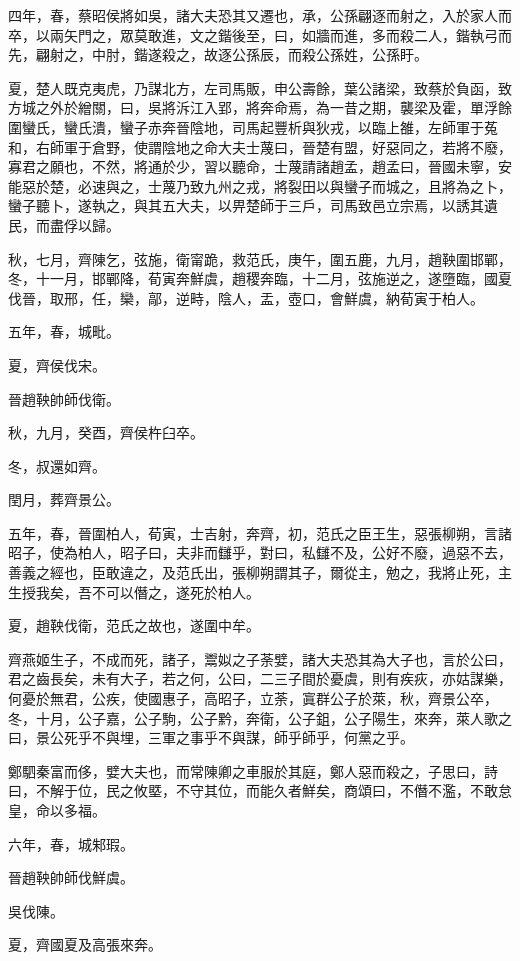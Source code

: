 \begin{pinyinscope}
四年，春，蔡昭侯將如吳，諸大夫恐其又遷也，承，公孫翩逐而射之，入於家人而卒，以兩矢門之，眾莫敢進，文之鍇後至，曰，如牆而進，多而殺二人，鍇執弓而先，翩射之，中肘，鍇遂殺之，故逐公孫辰，而殺公孫姓，公孫盱。

夏，楚人既克夷虎，乃謀北方，左司馬販，申公壽餘，葉公諸梁，致蔡於負函，致方城之外於繒關，曰，吳將泝江入郢，將奔命焉，為一昔之期，襲梁及霍，單浮餘圍蠻氏，蠻氏潰，蠻子赤奔晉陰地，司馬起豐析與狄戎，以臨上雒，左師軍于菟和，右師軍于倉野，使謂陰地之命大夫士蔑曰，晉楚有盟，好惡同之，若將不廢，寡君之願也，不然，將通於少，習以聽命，士蔑請諸趙孟，趙孟曰，晉國未寧，安能惡於楚，必速與之，士蔑乃致九州之戎，將裂田以與蠻子而城之，且將為之卜，蠻子聽卜，遂執之，與其五大夫，以畀楚師于三戶，司馬致邑立宗焉，以誘其遺民，而盡俘以歸。

秋，七月，齊陳乞，弦施，衛甯跪，救范氏，庚午，圍五鹿，九月，趙鞅圍邯鄲，冬，十一月，邯鄲降，荀寅奔鮮虞，趙稷奔臨，十二月，弦施逆之，遂墮臨，國夏伐晉，取邢，任，欒，鄗，逆畤，陰人，盂，壺口，會鮮虞，納荀寅于柏人。

五年，春，城毗。

夏，齊侯伐宋。

晉趙鞅帥師伐衛。

秋，九月，癸酉，齊侯杵臼卒。

冬，叔還如齊。

閏月，葬齊景公。

五年，春，晉圍柏人，荀寅，士吉射，奔齊，初，范氏之臣王生，惡張柳朔，言諸昭子，使為柏人，昭子曰，夫非而讎乎，對曰，私讎不及，公好不廢，過惡不去，善義之經也，臣敢違之，及范氏出，張柳朔謂其子，爾從主，勉之，我將止死，主生授我矣，吾不可以僭之，遂死於柏人。

夏，趙鞅伐衛，范氏之故也，遂圍中牟。

齊燕姬生子，不成而死，諸子，鬻姒之子荼嬖，諸大夫恐其為大子也，言於公曰，君之齒長矣，未有大子，若之何，公曰，二三子間於憂虞，則有疾疢，亦姑謀樂，何憂於無君，公疾，使國惠子，高昭子，立荼，寘群公子於萊，秋，齊景公卒，冬，十月，公子嘉，公子駒，公子黔，奔衛，公子鉏，公子陽生，來奔，萊人歌之曰，景公死乎不與埋，三軍之事乎不與謀，師乎師乎，何黨之乎。

鄭駟秦富而侈，嬖大夫也，而常陳卿之車服於其庭，鄭人惡而殺之，子思曰，詩曰，不解于位，民之攸塈，不守其位，而能久者鮮矣，商頌曰，不僭不濫，不敢怠皇，命以多福。

六年，春，城邾瑕。

晉趙鞅帥師伐鮮虞。

吳伐陳。

夏，齊國夏及高張來奔。


\end{pinyinscope}
